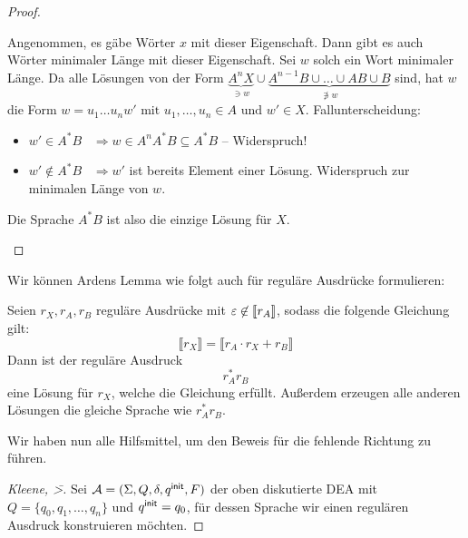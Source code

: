 {\begin{proof}
\begin{enumerate}
 Angenommen, es gäbe Wörter $x$ mit dieser Eigenschaft.
 Dann gibt es auch Wörter minimaler Länge mit dieser Eigenschaft.
 Sei $w$ solch ein Wort minimaler Länge.
 Da alle Lösungen von der Form $\underbrace{A^nX}_{\ni w} \cup \underbrace{A^{n-1}B \cup \dots \cup AB \cup B}_{\not\ni w}$ sind, hat $w$ die Form
 $w = u_1\dots u_n w'\text{ mit } u_1,\dots,u_n\in A\text{ und } w'\in X$.
 Fallunterscheidung:
 \begin{itemize}
  \item $w' \in A^*B$ \ $\Rightarrow w\in A^nA^*B\subseteq A^*B$ -- Widerspruch!
  \item $w' \notin A^*B$ \ $\Rightarrow w'$ ist bereits Element einer Lösung. Widerspruch zur minimalen Länge von $w$.
 \end{itemize}
 Die Sprache $A^*B$ ist also die einzige Lösung für $X$.
 \qedhere
\end{enumerate}
\end{proof}

Wir können Ardens Lemma wie folgt auch für reguläre Ausdrücke formulieren:
\begin{Korollar}
   Seien $r_X,r_A,r_B$ reguläre Ausdrücke mit $\varepsilon \not \in [\![ r_A ]\!]$, sodass die folgende Gleichung gilt:
  \begin{displaymath}
    \llbracket r_X \rrbracket = \llbracket r_A \cdot r_X + r_B \rrbracket
  \end{displaymath}
  Dann ist der reguläre Ausdruck
  \begin{displaymath}
    r_A^*r_B
  \end{displaymath}
  eine Lösung für $r_X$, welche die Gleichung erfüllt. Außerdem erzeugen alle anderen Lösungen die gleiche Sprache wie $r_A^*r_B$.
\end{Korollar}


\medskip

Wir haben nun alle Hilfsmittel, um den Beweis für die fehlende Richtung zu führen.

\begin{proof}[Kleene, \=>]
  Sei $\mathcal{A}=(\Sigma,{Q},\delta,q^\mathsf{init},F)$ der oben diskutierte \acs*{DEA} mit $Q = \{q_0,q_1,\dots,q_n\}$ und $q^\mathsf{init}=q_0$, für dessen Sprache wir einen regulären Ausdruck konstruieren möchten.
  

\end{proof}}
